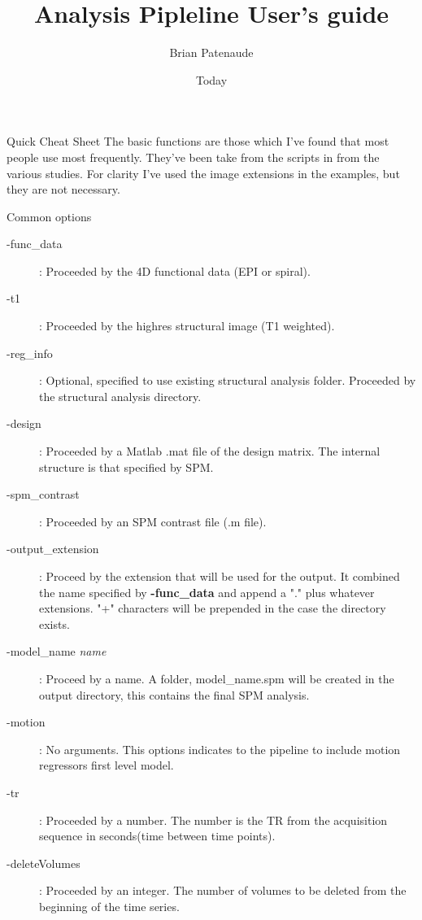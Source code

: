 \documentclass[]{article}
\begin{document}
\title{Analysis Pipleline User's guide}
\author{Brian Patenaude}
\date{Today}
\maketitle

\begin{section}{Quick Cheat Sheet}
The basic functions are those which I've found that most people use most frequently. They've been take from the scripts in from the various studies. For clarity I've used the image extensions in the examples, but they are not necessary.
\begin{subsection}{Common options}
\begin{description}
	\item [-func\_data] :  Proceeded by the 4D functional data (EPI or spiral).
	\item [ -t1]  : Proceeded by the highres structural image (T1 weighted). 
	\item [-reg\_info] : Optional, specified to use existing structural analysis folder. Proceeded by the structural analysis directory.
	\item [-design] : Proceeded by a Matlab .mat file of the design matrix. The internal structure is that specified by SPM.
	\item [-spm\_contrast] : Proceeded by an SPM contrast file (.m file).
	\item [-output\_extension] : Proceed by the extension that will be used for the output. It combined the name specified by 
						\hspace*{1cm} {\bf -func\_data} and append a "." plus whatever extensions. "+"  characters will be prepended in the case the directory 
						\hspace*{1cm}exists. 
	\item[-model\_name {\it name}] : Proceed by a name. A folder, model\_name.spm will be created in the output directory, this contains the final SPM analysis.
	\item[-motion] : No arguments. This options indicates to the pipeline to include motion regressors first level model.
	\item[-tr] : Proceeded by a number. The number is the TR from the acquisition sequence in seconds(time between time points).
	\item[-deleteVolumes] : Proceeded by an integer. The number of volumes to be deleted from the beginning of the time series.
\end{description}

\end{subsection}
\end{section}
\end{document}
